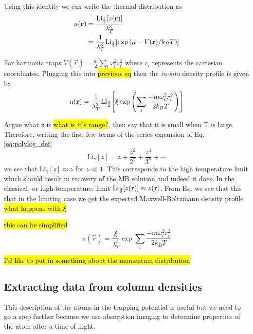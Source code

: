 Using this identity we can write the thermal distribution as
	\begin{equation}
	\begin{split}
	n(\mathbf{r}) &= \frac{\text{Li}_{\scriptscriptstyle\frac{3}{2}}\!\left[ z(\mathbf{r}) \right]}{\lambda_T^3} \\
				 &= \frac{1}{\lambda_T^3}\text{Li}_{\scriptscriptstyle\frac{3}{2}}\!\left[ \text{exp}\left( {\mu-V(\mathbf{r})/k_BT} \right) \right]
	\end{split}
	\end{equation}

For harmonic traps $V(\vec{r}) = \frac{m}{2}\displaystyle\sum_i\omega_i^2r_i^2$ where $r_i$ represents the cartesian cooridnates. Plugging this into \hl{previous eq} then the \textit{in-situ} density profile is given by
\begin{equation}
n(\mathbf{r}) = \frac{1}{\lambda_T^3}\text{Li}_{\scriptscriptstyle\frac{3}{2}}\!\left[ \xi\,\text{exp}\left( {\sum_i\frac{-m\omega_i^2r_i^2}{2 k_B T}} \right) \right]
\end{equation}

Argue what z is \hl{what is it's range?}, then say that it is small when T is large. Therefore, writing the first few terms of the series expansion of Eq.\ref{eq:polylog_def}
	\begin{equation}
	\text{Li}_{\gamma}[z] = z + \frac{z^2}{2^{\gamma}} + \frac{z^3}{3^{\gamma}} + \cdots
	\end{equation}
we see that Li$_{\gamma}[z] \approx z$ for $z \ll 1$. This corresponds to the high temperature limit which should result in recovery of the MB solution and indeed it does.
In the classical, or high-temperature, limit $\text{Li}_{\scriptscriptstyle\frac{3}{2}}\!\left[ z(\mathbf{r}) \right] \approx z(\mathbf{r})$. From Eq. we see that this that in the limiting case we get the expected Maxwell-Boltzmann density profile \hl{what happens with $\xi$}

\hl{this can be simplified}
\begin{equation}
n(\vec{r}) = \frac{\xi}{\lambda_T^3}\exp{\sum_i\frac{-m\omega_i^2r_i^2}{2 k_B T}}
\end{equation}

\hl{I'd like to put in something about the momentum distribution}

\subsection{Extracting data from column densities} \label{ssec:tof}

This description of the atoms in the trapping potential is useful but we need to go a step further because we use absorption imaging to determine properties of the atom after a time of flight.

